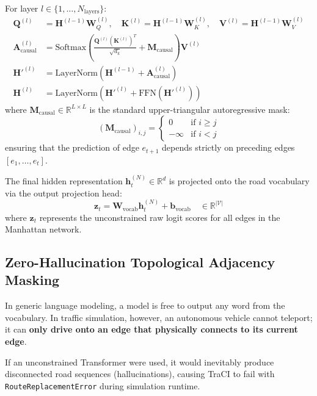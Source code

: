 \documentclass[12pt,a4paper]{article}
\begin{document}
For layer $l \in \{1, \dots, N_{\text{layers}}\}$:
\begin{align}
\mathbf{Q}^{(l)} &= \mathbf{H}^{(l-1)}\mathbf{W}_Q^{(l)}, \quad \mathbf{K}^{(l)} = \mathbf{H}^{(l-1)}\mathbf{W}_K^{(l)}, \quad \mathbf{V}^{(l)} = \mathbf{H}^{(l-1)}\mathbf{W}_V^{(l)} \\
\mathbf{A}_{\text{causal}}^{(l)} &= \text{Softmax}\left( \frac{\mathbf{Q}^{(l)}(\mathbf{K}^{(l)})^T}{\sqrt{d_k}} + \mathbf{M}_{\text{causal}} \right) \mathbf{V}^{(l)} \\
\mathbf{H}'^{(l)} &= \text{LayerNorm}\left( \mathbf{H}^{(l-1)} + \mathbf{A}_{\text{causal}}^{(l)} \right) \\
\mathbf{H}^{(l)} &= \text{LayerNorm}\left( \mathbf{H}'^{(l)} + \text{FFN}(\mathbf{H}'^{(l)}) \right)
\end{align}
where $\mathbf{M}_{\text{causal}} \in \mathbb{R}^{L \times L}$ is the standard upper-triangular autoregressive mask:
\begin{equation}
(\mathbf{M}_{\text{causal}})_{i, j} = \begin{cases} 0 & \text{if } i \ge j \\ -\infty & \text{if } i < j \end{cases}
\end{equation}
ensuring that the prediction of edge $e_{t+1}$ depends strictly on preceding edges $[e_1, \dots, e_t]$.

The final hidden representation $\mathbf{h}_t^{(N)} \in \mathbb{R}^d$ is projected onto the road vocabulary via the output projection head:
\begin{equation}
\mathbf{z}_t = \mathbf{W}_{\text{vocab}} \mathbf{h}_t^{(N)} + \mathbf{b}_{\text{vocab}} \quad \in \mathbb{R}^{|\mathcal{V}|}
\end{equation}
where $\mathbf{z}_t$ represents the unconstrained raw logit scores for all edges in the Manhattan network.

\subsection{Zero-Hallucination Topological Adjacency Masking}
In generic language modeling, a model is free to output any word from the vocabulary. In traffic simulation, however, an autonomous vehicle cannot teleport; it can \textbf{only drive onto an edge that physically connects to its current edge}.

If an unconstrained Transformer were used, it would inevitably produce disconnected road sequences (hallucinations), causing TraCI to fail with \texttt{RouteReplacementError} during simulation runtime.
\end{document}
